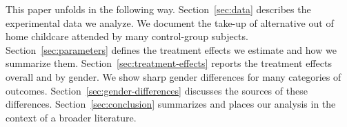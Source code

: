 This paper unfolds in the following way. Section~\ref{sec:data} describes the experimental data we analyze. We document the take-up of  alternative out of home childcare attended by many control-group subjects. Section~\ref{sec:parameters} defines the treatment effects we estimate and how we summarize them. Section~\ref{sec:treatment-effects} reports the treatment effects overall and by gender. We show sharp gender differences for many categories of outcomes. Section~\ref{sec:gender-differences} discusses the sources of these differences. Section~\ref{sec:conclusion} summarizes and places our analysis in the context of a  broader literature.

